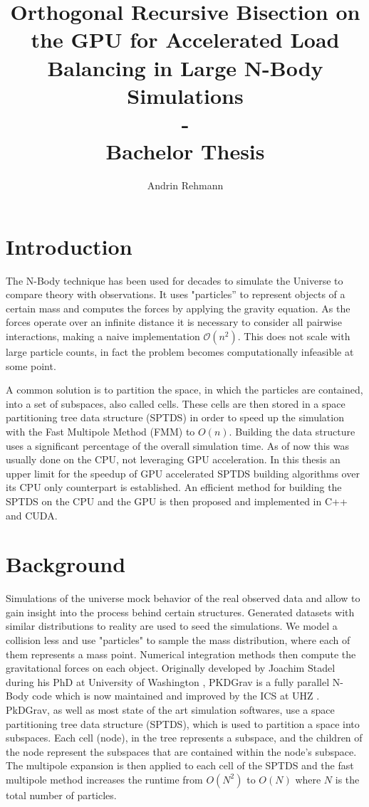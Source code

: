 \documentclass[]{article}
\title{Orthogonal Recursive Bisection on the GPU for Accelerated Load Balancing in Large N-Body Simulations \\ - \\ Bachelor Thesis}
\author{Andrin Rehmann}
\begin{document}
\maketitle

\newpage

\tableofcontents

\newpage
\section{Introduction}


The N-Body technique has been used for decades to simulate the Universe to compare theory with observations. It uses "particles'' to represent objects of a certain mass and computes the forces by applying the gravity equation. As the forces operate over an infinite distance it is necessary to consider all pairwise interactions, making a naive implementation $\mathcal{O}(n^2)$. This does not scale with large particle counts, in fact the problem becomes computationally infeasible at some point.

A common solution is to partition the space, in which the particles are contained, into a set of subspaces, also called cells. These cells are then stored in a space partitioning tree data structure (SPTDS) in order to speed up the simulation with the Fast Multipole Method (FMM) to $O(n)$. 
Building the data structure uses a significant percentage of the overall simulation time. As of now this was usually done on the CPU, not leveraging GPU acceleration. 
In this thesis an upper limit for the speedup of GPU accelerated SPTDS building algorithms over its CPU only counterpart is established. An efficient method for building the SPTDS on the CPU and the GPU is then proposed and implemented in C++ and CUDA.


\newpage
\section{Background}

Simulations of the universe mock behavior of the real observed data and allow to gain insight into the process behind certain structures\cite{Stadel2001}. Generated datasets with similar distributions to reality are used to seed the simulations. We model a collision less and use "particles" to sample the mass distribution, where each of them represents a mass point. Numerical integration methods then compute the gravitational forces on each object.
Originally developed by Joachim Stadel during his PhD at University of Washington \cite{Stadel2001}, PKDGrav is a fully parallel N-Body code which is now maintained and improved by the ICS at UHZ \cite{ICS}. 
PkDGrav, as well as most state of the art simulation softwares, use a space partitioning tree data structure (SPTDS), which is used to partition a space into subspaces. Each cell (node), in the tree represents a subspace, and the children of the node represent the subspaces that are contained within the node's subspace. The multipole expansion is then applied to each cell of the SPTDS and the fast multipole method increases the runtime from $O(N^2)$ to $O(N)$ where $N$ is the total number of particles. \cite{Stadel2001}
\end{document}
